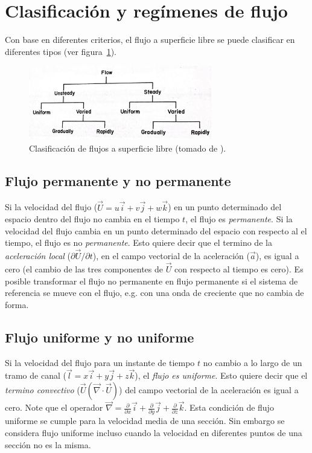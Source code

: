 \documentclass[11pt, oneside]{article}
\begin{document}
\section{Clasificaci\'on y reg\'imenes de flujo} %
Con base en diferentes criterios, el flujo a superficie libre se puede clasificar en diferentes tipos (ver figura~\ref{fig4}).

\begin{figure}[h]
\centering
\includegraphics[width=8cm]{fig4.jpeg}
\caption{Clasificaci\'on de flujos a superficie libre (tomado de \cite{Chau}).}
\label{fig4}
\end{figure}

\subsection{Flujo permanente y no permanente}
Si la velocidad del flujo ($\vec{U}= u\vec{i} + v\vec{j} + w\vec{k}$) en un punto determinado del espacio dentro del flujo no cambia en el tiempo $t$, el flujo es \emph{permanente}. Si la velocidad del flujo cambia en un punto determinado del espacio con respecto al el tiempo, el flujo es no \emph{permanente}. Esto quiere decir que el termino de la \emph{aceleración local} ($\partial{\vec{U}}/\partial{t}$), en el campo vectorial de la aceleración ($\vec{a}$), es igual a cero (el cambio de las tres componentes de $\vec{U}$ con respecto al tiempo es cero). Es posible transformar el flujo no permanente en flujo permanente si el sistema de referencia se mueve con el flujo, e.g. con una onda de creciente que no cambia de forma.  

\subsection{Flujo uniforme y no uniforme}
Si la velocidad del flujo para un instante de tiempo $t$ no cambio a lo largo de un tramo de canal ($\vec{l} = x\vec{i} + y\vec{j} + z\vec{k}$), el \emph{flujo es uniforme}. Esto quiere decir que el \emph{termino convectivo} ($\vec{U} ( \vec{\nabla} \cdot \vec{U} )$) del  campo vectorial de la aceleraci\'on es igual a cero. Note que el operador $\vec{\nabla}=\frac{\partial}{\partial x} \vec{i} + \frac{\partial}{\partial y} \vec{j} + \frac{\partial}{\partial z} \vec{k}$. Esta condici\'on de flujo uniforme se cumple para la velocidad media de una secci\'on. Sin embargo se considera flujo uniforme incluso cuando la velocidad en diferentes puntos de una secci\'on no es la misma. 
\end{document}
